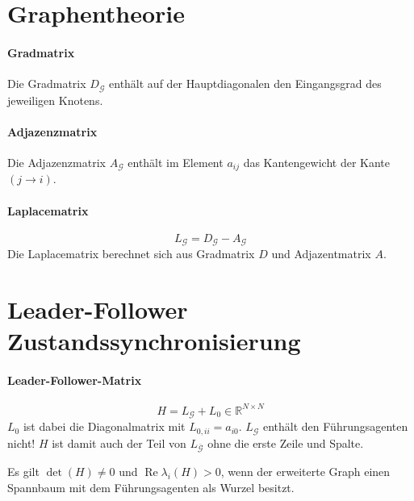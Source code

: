 \section{Graphentheorie}
\paragraph{Gradmatrix}
Die Gradmatrix $D_\mathcal{G}$ enthält auf der Hauptdiagonalen den Eingangsgrad des jeweiligen Knotens.

\paragraph{Adjazenzmatrix}
Die Adjazenzmatrix $A_\mathcal{G}$ enthält im Element $a_{ij}$
das Kantengewicht der Kante $(j \rightarrow i)$.

\paragraph{Laplacematrix}
\begin{equation}
    \tag{Laplacematrix}
    L_\mathcal{G} = D_\mathcal{G} - A_\mathcal{G}
    \label{eqn:laplace_matrix}
\end{equation}
Die Laplacematrix berechnet sich aus Gradmatrix $D$ und
Adjazentmatrix $A$.

\section{Leader-Follower Zustandssynchronisierung}
\paragraph{Leader-Follower-Matrix}
\label{par:leader_follower_matrix}
\begin{equation}
    \tag{Leader-Follower-Matrix}
    H = L_\mathcal{G} + L_0 \in \mathbb{R}^{N\times N}
    \label{eqn:lf_matrix}
\end{equation}
$L_0$ ist dabei die Diagonalmatrix mit $L_{0,ii}=a_{i0}$.
$L_\mathcal{G}$ enthält den Führungsagenten nicht!
$H$ ist damit auch der Teil von $L_{\overbar{\mathcal{G}}}$ ohne die erste Zeile
und Spalte.

Es gilt $\det(H) \neq 0$ und $\operatorname{Re}\lambda_i(H) > 0$,
wenn der erweiterte Graph einen Spannbaum mit dem Führungsagenten als
Wurzel besitzt.

